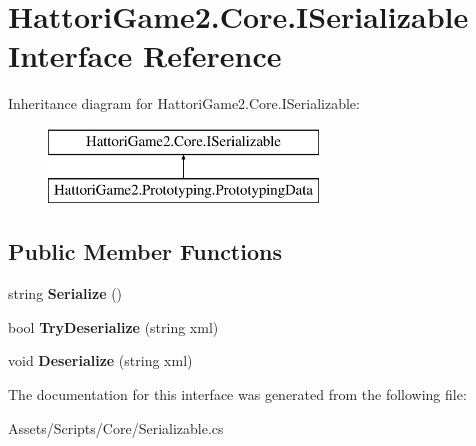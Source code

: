 \hypertarget{interface_hattori_game2_1_1_core_1_1_i_serializable}{}\section{Hattori\+Game2.\+Core.\+I\+Serializable Interface Reference}
\label{interface_hattori_game2_1_1_core_1_1_i_serializable}
Inheritance diagram for Hattori\+Game2.\+Core.\+I\+Serializable\+:\begin{figure}[H]
\begin{center}
\leavevmode
\includegraphics[height=2.000000cm]{interface_hattori_game2_1_1_core_1_1_i_serializable}
\end{center}
\end{figure}
\subsection*{Public Member Functions}
\begin{DoxyCompactItemize}
\item 
\hypertarget{interface_hattori_game2_1_1_core_1_1_i_serializable_a592ef615cfa80d4298df77309ab266d0}{}string {\bfseries Serialize} ()\label{interface_hattori_game2_1_1_core_1_1_i_serializable_a592ef615cfa80d4298df77309ab266d0}

\item 
\hypertarget{interface_hattori_game2_1_1_core_1_1_i_serializable_a6826d9742d146f8b711fd7021c54933c}{}bool {\bfseries Try\+Deserialize} (string xml)\label{interface_hattori_game2_1_1_core_1_1_i_serializable_a6826d9742d146f8b711fd7021c54933c}

\item 
\hypertarget{interface_hattori_game2_1_1_core_1_1_i_serializable_a71b58a42e6259425a351cf7c8383717e}{}void {\bfseries Deserialize} (string xml)\label{interface_hattori_game2_1_1_core_1_1_i_serializable_a71b58a42e6259425a351cf7c8383717e}

\end{DoxyCompactItemize}


The documentation for this interface was generated from the following file\+:\begin{DoxyCompactItemize}
\item 
Assets/\+Scripts/\+Core/Serializable.\+cs\end{DoxyCompactItemize}
